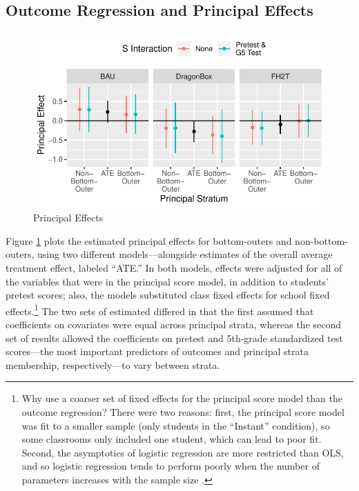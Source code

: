 \documentclass{statsoc} %
\begin{document}
\subsection{Outcome Regression and Principal Effects}\label{sec:outMod}
\begin{figure}
  \centering
  \includegraphics{../figure/prinEffs.pdf}
  \caption{Principal Effects}
  \label{fig:effects}
\end{figure}

Figure \ref{fig:effects} plots the estimated principal effects for bottom-outers and non-bottom-outers, using two different models---alongside estimates of the overall average treatment effect, labeled ``ATE.'' In both models, effects were adjusted for all of the variables that were in the principal score model, in addition to students' pretest scores; also, the models substituted class fixed effects for school fixed effects.\footnote{Why use a coarser set of fixed effects for the principal score model than the outcome regression? There were two reasons: first, the principal score model was fit to a smaller sample (only students in the ``Instant'' condition), so some classrooms only included one student, which can lead to poor fit. Second, the asymptotics of logistic regression are more restricted than OLS, and so logistic regression tends to perform poorly when the number of parameters increases with the sample size \citep{agresti}.}
The two sets of estimated differed in that the first assumed that coefficients on covariates were equal across principal strata, whereas the second set of results allowed the coefficients on pretest and 5th-grade standardized test scores---the most important predictors of outcomes and principal strata membership, respectively---to vary between strata.
\end{document}
